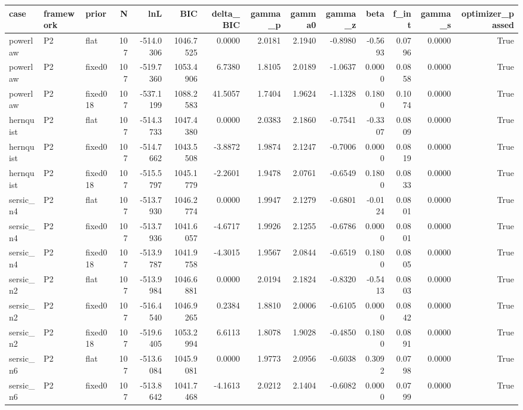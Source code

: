 \begin{tabular}{lllrrrrrrrrrrr}
\toprule
case & framework & prior & N & lnL & BIC & delta_BIC & gamma_p & gamma0 & gamma_z & beta & f_int & gamma_s & optimizer_passed \\
\midrule
powerlaw & P2 & flat & 107 & -514.0306 & 1046.7525 & 0.0000 & 2.0181 & 2.1940 & -0.8980 & -0.5693 & 0.0796 & 0.0000 & True \\
powerlaw & P2 & fixed0 & 107 & -519.7360 & 1053.4906 & 6.7380 & 1.8105 & 2.0189 & -1.0637 & 0.0000 & 0.0858 & 0.0000 & True \\
powerlaw & P2 & fixed018 & 107 & -537.1199 & 1088.2583 & 41.5057 & 1.7404 & 1.9624 & -1.1328 & 0.1800 & 0.1074 & 0.0000 & True \\
hernquist & P2 & flat & 107 & -514.3733 & 1047.4380 & 0.0000 & 2.0383 & 2.1860 & -0.7541 & -0.3307 & 0.0809 & 0.0000 & True \\
hernquist & P2 & fixed0 & 107 & -514.7662 & 1043.5508 & -3.8872 & 1.9874 & 2.1247 & -0.7006 & 0.0000 & 0.0819 & 0.0000 & True \\
hernquist & P2 & fixed018 & 107 & -515.5797 & 1045.1779 & -2.2601 & 1.9478 & 2.0761 & -0.6549 & 0.1800 & 0.0833 & 0.0000 & True \\
sersic_n4 & P2 & flat & 107 & -513.7930 & 1046.2774 & 0.0000 & 1.9947 & 2.1279 & -0.6801 & -0.0124 & 0.0801 & 0.0000 & True \\
sersic_n4 & P2 & fixed0 & 107 & -513.7936 & 1041.6057 & -4.6717 & 1.9926 & 2.1255 & -0.6786 & 0.0000 & 0.0801 & 0.0000 & True \\
sersic_n4 & P2 & fixed018 & 107 & -513.9787 & 1041.9758 & -4.3015 & 1.9567 & 2.0844 & -0.6519 & 0.1800 & 0.0805 & 0.0000 & True \\
sersic_n2 & P2 & flat & 107 & -513.9984 & 1046.6881 & 0.0000 & 2.0194 & 2.1824 & -0.8320 & -0.5413 & 0.0803 & 0.0000 & True \\
sersic_n2 & P2 & fixed0 & 107 & -516.4540 & 1046.9265 & 0.2384 & 1.8810 & 2.0006 & -0.6105 & 0.0000 & 0.0842 & 0.0000 & True \\
sersic_n2 & P2 & fixed018 & 107 & -519.6405 & 1053.2994 & 6.6113 & 1.8078 & 1.9028 & -0.4850 & 0.1800 & 0.0891 & 0.0000 & True \\
sersic_n6 & P2 & flat & 107 & -513.6084 & 1045.9081 & 0.0000 & 1.9773 & 2.0956 & -0.6038 & 0.3092 & 0.0798 & 0.0000 & True \\
sersic_n6 & P2 & fixed0 & 107 & -513.8642 & 1041.7468 & -4.1613 & 2.0212 & 2.1404 & -0.6082 & 0.0000 & 0.0799 & 0.0000 & True \\

\end{tabular}
